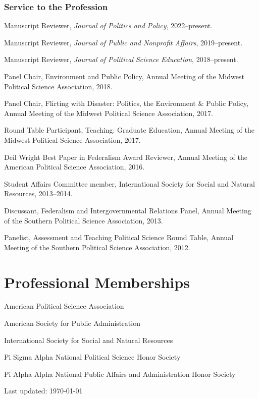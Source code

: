 \documentclass[12pt,letterpaper]{article}
\renewenvironment{itemize}{
  \begin{list}{}{
    \setlength{\leftmargin}{1.5em}
    \setlength{\itemsep}{0.25em}
    \setlength{\parskip}{0pt}
    \setlength{\parsep}{0.25em}
  }
}{
  \end{list}
}
\begin{document}
\subsubsection*{Service to the Profession}
\begin{itemize}\leftmargin=2pt\itemindent=-15pt
  \item Manuscript Reviewer, \emph{Journal of Politics and Policy}, 2022--present.
  \item Manuscript Reviewer, \emph{Journal of Public and Nonprofit Affairs}, 2019--present.
  \item Manuscript Reviewer, \emph{Journal of Political Science Education}, 2018--present.
  \item Panel Chair, Environment and Public Policy, Annual Meeting of the Midwest Political Science Association, 2018.
  \item Panel Chair, Flirting with Disaster: Politics, the Environment \& Public Policy, Annual Meeting of the Midwest Political Science Association, 2017. 
  \item Round Table Participant, Teaching: Graduate Education, Annual Meeting of the Midwest Political Science Association, 2017.
  \item Deil Wright Best Paper in Federalism Award Reviewer, Annual Meeting of the American Political Science Association, 2016.
  \item Student Affairs Committee member, International Society for Social and Natural Resources, 2013--2014.
  \item Discussant, Federalism and Intergovernmental Relations Panel, Annual Meeting of the Southern Political Science Association, 2013.
  \item Panelist, Assessment and Teaching Political Science Round Table, Annual Meeting of the Southern Political Science Association, 2012.
\end{itemize}

\section*{Professional Memberships}
\begin{itemize}\leftmargin=2pt\itemindent=-15pt
  \item American Political Science Association
  \item American Society for Public Administration
  \item International Society for Social and Natural Resources
  \item Pi Sigma Alpha National Political Science Honor Society
  \item Pi Alpha Alpha National Public Affairs and Administration Honor Society
\end{itemize}

	
\vspace{.5in}
\begin{center}
  \begin{small}
    Last updated: \today
      \end{small}
\end{center}
\end{document}
